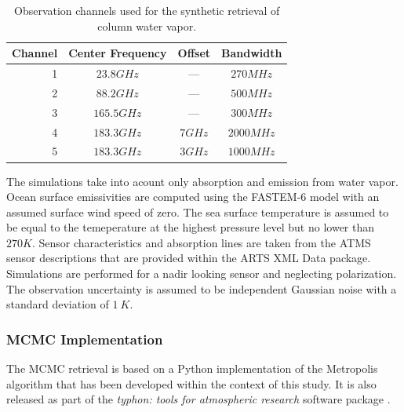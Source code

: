 \documentclass[journal abbreviation, manuscript]{copernicus}
\begin{document}
\begin{table}[hbpt]
\centering
\begin{tabular}{|r|c|c|c|}
    \hline
    Channel & Center Frequency & Offset           & Bandwidth                \\ 
    \hline
                  1 & $23.8 \unit{GHz}$ &        ---       & $270 \unit{MHz}$ \\
                  2 & $88.2 \unit{GHz}$ &        ---       & $500 \unit{MHz}$ \\
                  3 & $165.5\unit{GHz}$ &        ---       & $300 \unit{MHz}$ \\
                  4 & $183.3\unit{GHz}$ & $7   \unit{GHz}$ & $2000\unit{MHz}$ \\
                  5 & $183.3\unit{GHz}$ & $3   \unit{GHz}$ & $1000\unit{MHz}$ \\
    \hline
\end{tabular}
\caption{Observation channels used for the synthetic retrieval of column water vapor.}
\label{tab:channels}
\end{table}

The simulations take into acount only absorption and emission from water
vapor. Ocean surface emissivities are computed using the FASTEM-6
\citep{fastem6} model with an assumed surface wind speed of zero. The sea
surface temperature is assumed to be equal to the temeperature at the highest
pressure level but no lower than $270\unit{K}$. Sensor characteristics and
absorption lines are taken from the ATMS sensor descriptions that are provided
within the ARTS XML Data package. Simulations are performed for a nadir looking
sensor and neglecting polarization. The observation uncertainty is assumed to be
independent Gaussian noise with a standard deviation of $1\:\unit{K}$.


\subsubsection{MCMC Implementation}

  The MCMC retrieval is based on a Python implementation of the Metropolis
  algorithm \citep[Ch. 12]{bda} that has been developed within the context of
  this study. It is also released as part of the \textit{typhon: tools for atmospheric
  research} software package \citep{typhon}.
\end{document}
